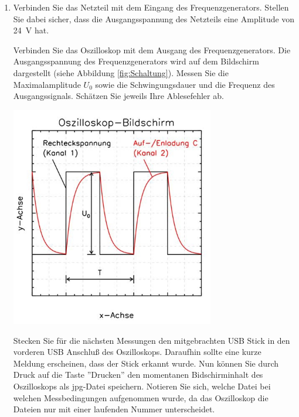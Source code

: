 \begin{enumerate}
 \item Verbinden Sie das Netzteil mit dem Eingang des Frequenzgenerators. Stellen Sie dabei sicher, dass die Ausgangsspannung des Netzteils eine Amplitude von 24~V hat.\\
	\begin{minipage}{0.45\textwidth}
		Verbinden Sie das Oszilloskop mit dem Ausgang des Frequenzgenerators. Die Ausgangsspannung des Frequenzgenerators wird auf dem Bildschirm dargestellt (siehe Abbildung \ref{fig:Schaltung}). Messen Sie die Maximalamplitude 
		$U_0$ sowie die Schwingungsdauer und die Frequenz des Ausgangssignals. Schätzen Sie jeweils Ihre Ablesefehler ab.
	\end{minipage} 
	\hfill
	\begin{minipage}{0.45\textwidth}
		\raggedright
			\includegraphics[width=0.7\textwidth]{Abbildungen/Oszi.jpg}
			\label{fig:Oszi}
	\end{minipage}
%
\begin{hint}
	Stecken Sie für die nächsten Messungen den mitgebrachten USB Stick in den vorderen USB Anschluß des Oszilloskops. Daraufhin sollte eine kurze Meldung erscheinen, dass der Stick erkannt wurde. Nun können Sie durch Druck auf die Taste ''Drucken'' den momentanen Bidschirminhalt des Oszilloskops als jpg-Datei speichern. Notieren Sie sich, welche Datei bei welchen Messbedingungen aufgenommen wurde, da das Oszilloskop die Dateien nur mit einer laufenden Nummer unterscheidet.
\end{hint}


\end{enumerate}
